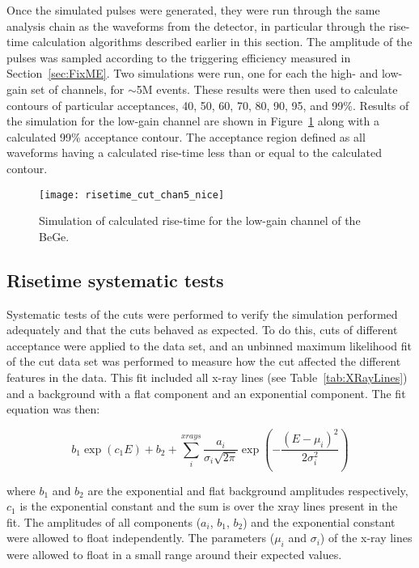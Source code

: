 	Once the simulated pulses were generated, they were run through the same analysis chain as the waveforms from the detector, in particular through the rise-time calculation algorithms described earlier in this section.  The amplitude of the pulses was sampled according to the triggering efficiency measured in Section~\ref{sec:FixME}.  Two simulations were run, one for each the high- and low-gain set of channels, for $\sim$5M events.  These results were then used to calculate contours of particular acceptances, 40, 50, 60, 70, 80, 90, 95, and 99\%.  Results of the simulation for the low-gain channel are shown in Figure~\ref{fig:RisetimeSimulation} along with a calculated 99\% acceptance contour.  The acceptance region defined as all waveforms having a calculated rise-time less than or equal to the calculated contour.  
					
				\begin{figure}
					\centering
					\texttt{[image: risetime\_cut\_chan5\_nice]}
					\caption{Simulation of calculated rise-time for the low-gain channel of the BeGe.}
					\label{fig:RisetimeSimulation}
				\end{figure}	
	
		\subsection{Risetime systematic tests}
		\label{sec:RisetimeSystematicTests}	
	
	Systematic tests of the cuts were performed to verify the simulation performed adequately and that the cuts behaved as expected.  To do this, cuts of different acceptance were applied to the data set, and an unbinned maximum likelihood fit of the cut data set was performed to measure how the cut affected the different features in the data.  This fit included all x-ray lines (see Table~\ref{tab:XRayLines}) and a background with a flat component and an exponential component.  The fit equation was then:

					\begin{equation}
						b_{1} \exp\left(c_{1} E\right) + b_{2} + \sum^{xrays}_{i} \frac{a_{i}}{\sigma_{i}\sqrt{2 \pi}} 
							\exp\left(-\frac{(E - \mu_{i})^{2}}{2 \sigma_{i}^{2}}\right)
						\label{eqn:InitialFitEqn}
					\end{equation}

where $b_{1}$ and $b_{2}$ are the exponential and flat background amplitudes respectively, $c_{1}$ is the exponential constant and the sum is over the xray lines present in the fit.  The amplitudes of all components ($a_{i}$, $b_{1}$, $b_{2}$) and the exponential constant were allowed to float independently.  The parameters ($\mu_{i}$ and $\sigma_{i}$) of the x-ray lines were allowed to float in a small range around their expected values.  

